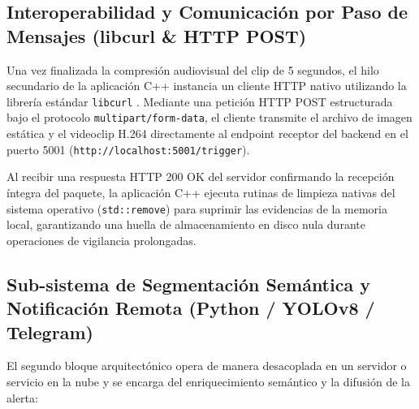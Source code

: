 \documentclass[12pt]{article}
\begin{document}
\subsection{Interoperabilidad y Comunicación por Paso de Mensajes (libcurl \& HTTP POST)}
Una vez finalizada la compresión audiovisual del clip de 5 segundos, el hilo secundario de la aplicación C++ instancia un cliente HTTP nativo utilizando la librería estándar \texttt{libcurl} \cite{stenberg2000curl}. Mediante una petición HTTP POST estructurada bajo el protocolo \texttt{multipart/form-data}, el cliente transmite el archivo de imagen estática y el videoclip H.264 directamente al endpoint receptor del backend en el puerto 5001 (\texttt{http://localhost:5001/trigger}).

Al recibir una respuesta HTTP 200 OK del servidor confirmando la recepción íntegra del paquete, la aplicación C++ ejecuta rutinas de limpieza nativas del sistema operativo (\texttt{std::remove}) para suprimir las evidencias de la memoria local, garantizando una huella de almacenamiento en disco nula durante operaciones de vigilancia prolongadas.

\subsection{Sub-sistema de Segmentación Semántica y Notificación Remota (Python / YOLOv8 / Telegram)}
El segundo bloque arquitectónico opera de manera desacoplada en un servidor o servicio en la nube y se encarga del enriquecimiento semántico y la difusión de la alerta:
\end{document}
